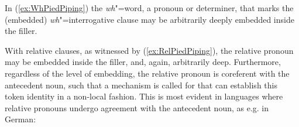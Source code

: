 \documentclass[output=paper
	        ,collection
	        ,collectionchapter
 	        ,biblatex
                ,babelshorthands
                ,newtxmath
                ,draftmode
                ,colorlinks, citecolor=brown
]{langscibook}
\begin{document}
{\begin{exe}
  \ex \label{ex:WhPiedPiping}
  \begin{xlist}
  \end{xlist}
\end{exe}

\begin{exe}
  \ex \label{ex:RelPiedPiping}
  \begin{xlist}
  \end{xlist}
\end{exe}

\noindent
In (\ref{ex:WhPiedPiping}) the \emph{wh}"=word, a pronoun or determiner, that
marks the (embedded) \emph{wh}"=interrogative clause may be arbitrarily deeply embedded inside the filler.  

With relative clauses, as witnessed by (\ref{ex:RelPiedPiping}), the
relative pronoun may be embedded inside the filler, and, again,
arbitrarily deep. Furthermore, regardless of the level of embedding,
the relative pronoun is coreferent with the antecedent noun, such that
a mechanism is called for that can establish this token identity in a
non-local fashion. This is most evident in languages where relative
pronouns undergo agreement with the antecedent noun, as e.g. in
German:

}
\end{document}

